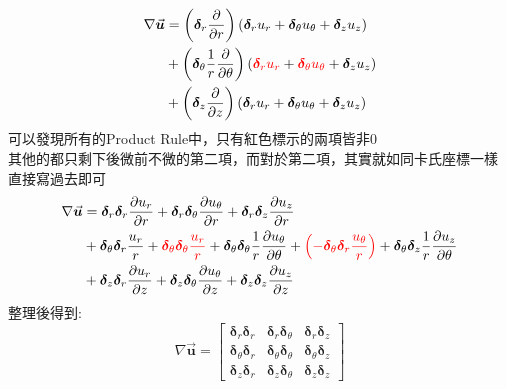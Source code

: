 \documentclass[../main.tex]{subfiles}
\begin{document}
\begin{itemize}
\begin{itemize}
\begin{enumerate}
\begin{align}
            \nabla \vec{\bm u} &= \left(\bm\delta_r \frac{\partial}{\partial r}\right) \left(
              \bm\delta_r u_r + \bm\delta_\theta u_\theta + \bm\delta_z u_z
            \right) \nonumber\\
            &+ \left(\bm\delta_\theta \frac{1}{r}\frac{\partial}{\partial \theta}\right) \left(
              {\color{red}\bm\delta_r u_r} + {\color{red}\bm\delta_\theta u_\theta} + \bm\delta_z u_z
            \right) \nonumber\\
            &+ \left(\bm\delta_z \frac{\partial}{\partial z}\right) \left(
              \bm\delta_r u_r + \bm\delta_\theta u_\theta + \bm\delta_z u_z
            \right)
          \end{align}
          可以發現所有的Product Rule中，只有紅色標示的兩項皆非0\\
          其他的都只剩下後微前不微的第二項，而對於第二項，其實就如同卡氏座標一樣\\
          直接寫過去即可
          \begin{align}
            \nabla \vec{\bm u} &= \bm\delta_r\bm\delta_r \frac{\partial u_r}{\partial r} +
            \bm\delta_r\bm\delta_\theta \frac{\partial u_\theta}{\partial r} +
            \bm\delta_r\bm\delta_z \frac{\partial u_z}{\partial r} \nonumber\\
            &+ \bm\delta_\theta\bm\delta_r \frac{u_r}{r} + \color{red}\bm\delta_\theta\bm\delta_\theta \frac{u_r}{r} \color{black} +
            \bm\delta_\theta\bm\delta_\theta \frac{1}{r} \frac{\partial u_\theta}{\partial \theta} + 
            \color{red}\left(-\bm\delta_\theta\bm\delta_r \frac{ u_\theta}{r}\right) \color{black} +
            \bm\delta_\theta\bm\delta_z \frac{1}{r} \frac{\partial u_z}{\partial \theta} \nonumber\\
            &+ \bm\delta_z\bm\delta_r \frac{\partial u_r}{\partial z} +
            \bm\delta_z\bm\delta_\theta \frac{\partial u_\theta}{\partial z} +
            \bm\delta_z\bm\delta_z \frac{\partial u_z}{\partial z}
          \end{align}
          整理後得到:
          \begin{equation}
            \nabla \vec{\bm u} =
            \begin{bmatrix}
              \bm\delta_r\bm\delta_r & \bm\delta_r\bm\delta_\theta & \bm\delta_r\bm\delta_z \\
              \bm\delta_\theta\bm\delta_r & \bm\delta_\theta\bm\delta_\theta & \bm\delta_\theta\bm\delta_z \\
              \bm\delta_z\bm\delta_r & \bm\delta_z\bm\delta_\theta & \bm\delta_z\bm\delta_z

\end{bmatrix}
\end{equation}
\end{enumerate}
\end{itemize}
\end{itemize}
\end{document}
